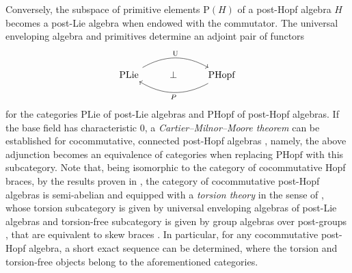 \documentclass[10pt]{article}
\theoremstyle{definition}
\begin{document}
Conversely, the subspace of primitive elements $\mathrm{P}(H)$ of a post-Hopf algebra $H$ becomes a post-Lie algebra when endowed with the commutator. The universal enveloping algebra and primitives determine an adjoint pair of functors 
\begin{equation}\label{adj:LieHopf}
	\begin{tikzcd}
		\mathrm{PLie} \arrow[rr, bend left, "\mathrm{U}"] & \perp & \mathrm{PHopf} \arrow[ll, bend left, "P"]
	\end{tikzcd}
	\end{equation}
	for the categories $\mathrm{PLie}$ of post-Lie algebras and $\mathrm{PHopf}$ of post-Hopf algebras. If the base field has characteristic 0, a \emph{Cartier--Milnor--Moore theorem} \cite{MilnorMoore} can be established for cocommutative, connected post-Hopf algebras \cite{Catoire,ZD}, namely, the above adjunction becomes an equivalence of categories when replacing $\mathrm{PHopf}$ with this subcategory. Note that, being isomorphic to the category of cocommutative Hopf braces, by the results proven in \cite{GS}, the category of cocommutative post-Hopf algebras is semi-abelian \cite{Semiabelian} and equipped with a \textit{torsion theory} in the sense of \cite{BournGran}, whose torsion subcategory is given by universal enveloping algebras of post-Lie algebras and torsion-free subcategory is given by group algebras over post-groups \cite{BGST}, that are equivalent to skew braces \cite{GuVe}. In particular, for any cocommutative post-Hopf algebra, a short exact sequence can be determined, where the torsion and torsion-free objects belong to the aforementioned categories.
\medskip
\end{document}
